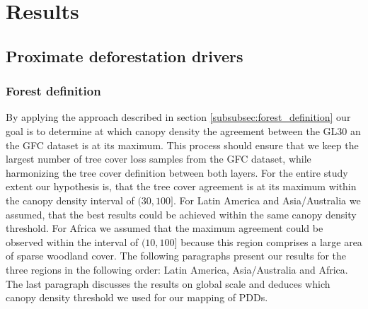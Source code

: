 \chapter{Results}
\label{ch:results}
	\section{Proximate deforestation drivers}
	\label{sec:results_deforestation}
		\subsection{Forest definition}
		\label{subsec:results_forest_definition}
			By applying the approach described in section \ref{subsubsec:forest_definition} our goal is to determine at which canopy density the agreement between the \ac{GL30} an the \ac{GFC} dataset is at its maximum. This process should ensure that we keep the largest number of tree cover loss samples from the \ac{GFC} dataset, while harmonizing the tree cover definition between both layers. For the entire study extent our hypothesis is, that the tree cover agreement is at its maximum within the canopy density interval of $(30,100]$. For Latin America and Asia/Australia we assumed, that the best results could be achieved within the same canopy density threshold. For Africa we assumed that the maximum agreement could be observed within the interval of $(10,100]$ because this region comprises a large area of sparse woodland cover. The following paragraphs present our results for the three regions in the following order: Latin America, Asia/Australia and Africa. The last paragraph discusses the results on global scale and deduces which canopy density threshold we used for our mapping of \acp{PDD}.
